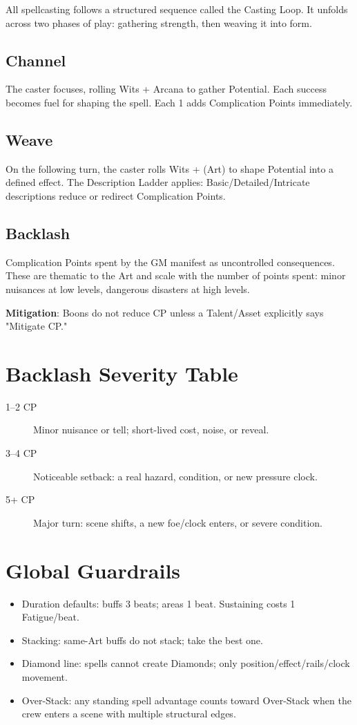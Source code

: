 All spellcasting follows a structured sequence called the Casting Loop. It unfolds across two phases of play: gathering strength, then weaving it into form.

\subsection{Channel}
The caster focuses, rolling Wits + Arcana to gather Potential. Each success becomes fuel for shaping the spell. Each 1 adds Complication Points immediately.

\subsection{Weave}
On the following turn, the caster rolls Wits + (Art) to shape Potential into a defined effect. The Description Ladder applies: Basic/Detailed/Intricate descriptions reduce or redirect Complication Points.

\subsection{Backlash}
Complication Points spent by the GM manifest as uncontrolled consequences. These are thematic to the Art and scale with the number of points spent: minor nuisances at low levels, dangerous disasters at high levels.

\textbf{Mitigation}: Boons do not reduce CP unless a Talent/Asset explicitly says "Mitigate CP."

\section{Backlash Severity Table}

\begin{description}
\item[1--2 CP] Minor nuisance or tell; short-lived cost, noise, or reveal.
\item[3--4 CP] Noticeable setback: a real hazard, condition, or new pressure clock.
\item[5+ CP] Major turn: scene shifts, a new foe/clock enters, or severe condition.
\end{description}

\section{Global Guardrails}

\begin{itemize}
\item Duration defaults: buffs 3 beats; areas 1 beat. Sustaining costs 1 Fatigue/beat.
\item Stacking: same-Art buffs do not stack; take the best one.
\item Diamond line: spells cannot create Diamonds; only position/effect/rails/clock movement.
\item Over-Stack: any standing spell advantage counts toward Over-Stack when the crew enters a scene with multiple structural edges.
\end{itemize}

